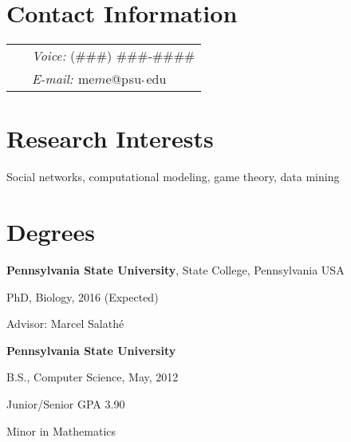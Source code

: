 \documentclass[margin,line]{res}
\newenvironment{list1}{
  \begin{list}{\ding{113}}{%
      \setlength{\itemsep}{0in}
      \setlength{\parsep}{0in} \setlength{\parskip}{0in}
      \setlength{\topsep}{0in} \setlength{\partopsep}{0in} 
      \setlength{\leftmargin}{0.17in}}}{\end{list}}
\begin{document}

\begin{resume}
\section{\sc Contact Information}
\vspace{.05in}
\begin{tabular}{@{}p{2in}p{4in} }
     & {\it Voice:}  (\#\#\#) \#\#\#-\#\#\#\#  \\             %
\   &  {\it E-mail:}  \(^{}\)me\(m\)e@p\(^{}\)su\(_{^*}\)\(^{}\)edu \\         %
\end{tabular}


\section{\sc Research Interests}
Social networks, computational modeling, game theory, data mining
\ \\
\section{\sc Degrees}
{\bf Pennsylvania State University}, State College, Pennsylvania USA\\
\vspace*{-.1in}
\begin{list1}
\item[] PhD, Biology, 2016 (Expected)
\item[] Advisor: Marcel Salath\'e
\end{list1}
{\bf Pennsylvania State University} \\
\vspace*{-.1in}
\begin{list1}
\item[] B.S., Computer Science,  May, 2012 
\item[] Junior/Senior GPA 3.90
\item[] Minor in Mathematics
\end{list1}


\end{resume}
\end{document}
